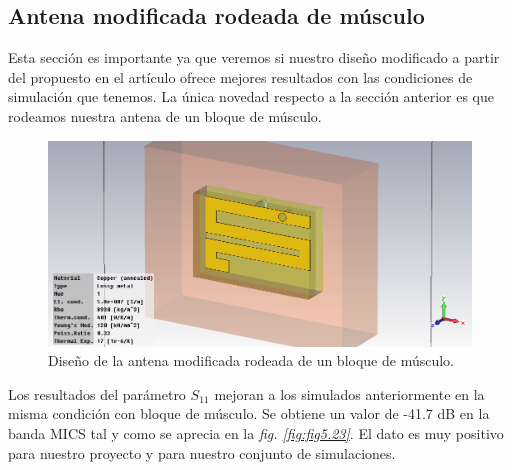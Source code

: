 \clearpage

\subsection{Antena modificada rodeada de músculo}\label{subsec:antena-modificada-rodeada-de-musculo}

Esta sección es importante ya que veremos si nuestro diseño modificado a partir del propuesto en el artículo ofrece mejores resultados con las condiciones de simulación que tenemos. La única novedad respecto a la sección anterior es que rodeamos nuestra antena de un bloque de músculo.

\begin{figure}[!htb]
    \centering
    \includegraphics[scale=0.45]{./Simulaciones/tunned_antenna_muscle/tunned_serpentine_muscle}
    \caption{Diseño de la antena modificada rodeada de un bloque de músculo.}
    \label{fig:fig5.22}
\end{figure}

Los resultados del parámetro $S_{11}$ mejoran a los simulados anteriormente en la misma condición con bloque de músculo. Se obtiene un valor de -41.7 dB en la banda MICS tal y como se aprecia en la \textit{fig. \ref{fig:fig5.23}}. El dato es muy positivo para nuestro proyecto y para nuestro conjunto de simulaciones.

